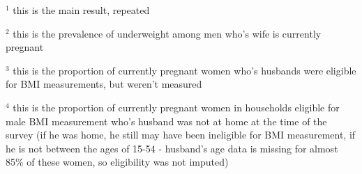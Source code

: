 \documentclass[12pt]{article}
\begin{document}
\begin{table}[!htbp]
    \centering
    \begin{threeparttable}[t]
        \caption{:  Underweight prevalence of prepregnant women and men who's wife is pregnant}

        \scriptsize
        \setlength{\tabcolsep}{2pt}
        \renewcommand{\arraystretch}{1.2}

        

        \begin{tablenotes}
        \item $^1$ this is the main result, repeated
        \item $^2$ this is the prevalence of underweight among men who's wife is currently pregnant
        \item $^3$ this is the proportion of currently pregnant women who's husbands were eligible for BMI measurements, but weren't measured

        \item $^4$ this is the proportion of currently pregnant women in households eligible for male BMI measurement who's husband was not at home at the time of the survey (if he was home, he still may have been ineligible for BMI measurement, if he is not between the ages of 15-54 - husband's age data is missing for almost 85\% of these women, so eligibility was not imputed)
        
        \end{tablenotes}
    \end{threeparttable}
\end{table}
\end{document}
